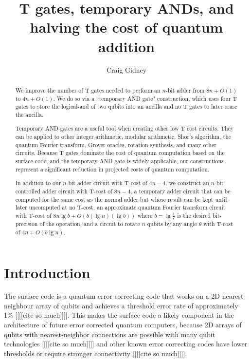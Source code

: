 \documentclass[twocolumn,longbibliography]{quantumarticle-customized}
\title{T gates, temporary ANDs, and halving the cost of quantum addition}
\author{Craig Gidney}
\affiliation{Google, Santa Barbara, CA 93117, USA}
\begin{document}
\maketitle

\begin{abstract}
We improve the number of T gates needed to perform an $n$-bit adder from $8n + O(1)$ \cite{Amy2013, AustinDiscussionsAndEmails2017} to $4n + O(1)$.
We do so via a ``temporary AND gate" construction, which uses four T gates to store the logical-and of two qubits into an ancilla and no T gates to later erase the ancilla.

Temporary AND gates are a useful tool when creating other low T cost circuits.
They can be applied to other integer arithmetic, modular arithmetic, Shor's algorithm, the quantum Fourier transform, Grover oracles, rotation synthesis, and many other circuits.
Because T gates dominate the cost of quantum computation based on the surface code, and the temporary AND gate is widely applicable, our constructions represent a significant reduction in projected costs of quantum computation.

In addition to our $n$-bit adder circuit with T-cost of $4n-4$, we construct an $n$-bit controlled adder circuit with T-cost of $8n-4$, a temporary adder circuit that can be computed for the same cost as the normal adder but whose result can be kept until later uncomputed at no T-cost, an approximate quantum Fourier transform circuit with T-cost of $8 n \lg b + O(b (\lg n) (\lg b))$ where $b = \lg \frac{1}{\epsilon}$ is the desired bit-precision of the operation, and a circuit to rotate $n$ qubits by any angle $\theta$ with T-cost of $4n + O(b \lg n)$.
\end{abstract}


\section{Introduction}
\label{sec:introduction}

The surface code is a quantum error correcting code that works on a 2D nearest-neighbour array of qubits and achieves a threshold error rate of approximately 1\% [[[[cite so much]]]].
This makes the surface code a likely component in the architecture of future error corrected quantum computers, because 2D arrays of qubits with nearest-neighbor connections are possible with many qubit technologies [[[[cite so much]]]] and other known error correcting codes have lower thresholds or require stronger connectivity [[[[cite so much]]]].
\end{document}

